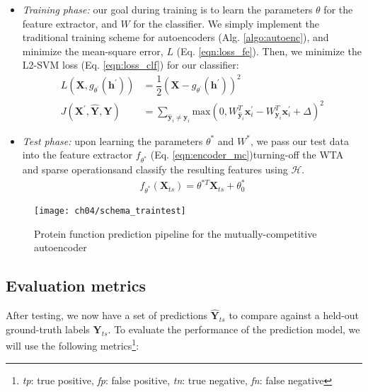 \begin{itemize}
  \item \textit{Training phase:} our goal during training is to learn the
  parameters $\theta$ for the feature extractor, and $W$ for the classifier.
  We simply implement the traditional training scheme for autoencoders (Alg.
  \ref{algo:autoenc}), and minimize the mean-square error, $L$ (Eq.
  \ref{eqn:loss_fe}). Then, we minimize the L2-SVM loss (Eq.
  \ref{eqn:loss_clf}) for our classifier:
  \begin{align}
    \label{eqn:loss_fe}
    L(\mathbf{X},g_{\theta^{\prime}}(\mathbf{h}^{\prime})) &=
      \dfrac{1}{2}(\mathbf{X} - g_{\theta^{\prime}}(\mathbf{h}^{\prime}))^{2}\\
    \label{eqn:loss_clf}
    J(\mathbf{X}^{\prime}, \widehat{\mathbf{Y}}, \mathbf{Y}) &= \sum_{\widehat{\mathbf{y}}_i \neq \mathbf{y}_{i}} \text{max}(0, W^{T}_{\widehat{\mathbf{y}}_{i}} \mathbf{x}_{i}^{\prime} - W^{T}_{\mathbf{y}_i}\mathbf{x}^{\prime}_i + \Delta)^2
  \end{align}
  \item \textit{Test phase:} upon learning the parameters $\theta^{\ast}$ and
  $W^{\ast}$, we pass our test data into the feature extractor
  $f_{\theta^{\ast}}$ (Eq. \ref{eqn:encoder_mc})\textemdash turning-off the WTA and sparse
  operations\textemdash and classify the resulting features using
  $\mathcal{H}$.
  \begin{align}
    \label{eqn:encoder_mc}
    f_{\theta^{\ast}}(\mathbf{X}_{ts}) = \theta^{\ast T} \mathbf{X}_{ts} + \theta_{0}^{\ast}
  \end{align}
\end{itemize}

\begin{figure}[!h]
  \centering
  \texttt{[image: ch04/schema\_traintest]}
  \caption[Protein function prediction pipeline]{Protein function prediction
  pipeline for the mutually-competitive autoencoder}
  \label{schema:traintest_mc}
\end{figure}

\newpage
\subsection{Evaluation metrics}

After testing, we now have a set of predictions $\mathbf{\widehat{Y}}_{ts}$
to compare against a held-out ground-truth labels $\mathbf{Y}_{ts}$. To
evaluate the performance of the prediction model, we will use the following
metrics\footnote[2]{\textit{tp}: true positive, \textit{fp}: false positive,
\textit{tn}: true negative, \textit{fn}: false negative}:

